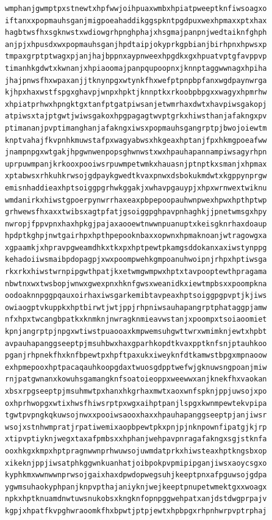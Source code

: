 \documentclass[11pt,letterpaper]{exam}
\begin{document}
\begin{questions}
\begin{verbatim}
wmphanjgwmptpxstnewtxhpfwwjoihpuaxwmbxhpiatpweeptknfiwsoagxo
iftanxxpopmauhsganjmigpoeahaddikggspkntpgdpuxwexhpmaxxptxhax
hagbtwsfhxsgknwstxwdiowgrhpnghphajxhsgmajpanpnjwedtaiknfghph
anjpjxhpusdxwxpopmauhsganjhpdtaipjokyprkgpbianjbirhpnxhpwsxp
tmpaxgrptptwagxpjanjhajbppnxaypnweexhpgdkxgxhpuatvptgfavppvp
timanhkgdwtxkwnanjxhpiaoomajpanpqupoopnxjknnptaggwwnagxhpiha
jhajpnwsfhxwpaxanjjtknynpgxwtynkfhxwefptpnpbpfanxwgdpaynwrga
kjhpxhaxwstfspgxghavpjwnpxhpktjknnptkxrkoobpbpgxxwagyxhpmrhw
xhpiatprhwxhpngktgxtanfptgatpiwsanjetwmrhaxdwtxhavpiwsgakopj
atpiwsxtajptgwtjwiwsgakoxhpgpagagtwvptgrkxhiwsthanjafakngxpv
ptimananjpvptimanghanjafakngxiwsxpopmauhsgangrptpjbwojoiewtm
knptvahajfkvpnhkmuwstafpxwagyabwsxhkgeaxhptanjfpxhkmgpoeafww
jnampnpgxwtgakjhpgwnwenpopsghwnwstxwxhpauhapannampiwsagyrhpn
uprpuwmpanjkrkooxpooiwsrpuwmpetwmkxhauasnjptnptkxsmanjxhpmax
xptabwsxrhkuhkrwsojgdpaykgwedtkvaxpnwxdsbokukmdwtxkgppynprgw
emisnhaddieaxhptsoiggpgrhwkggakjxwhavpgauypjxhpxwrnwextwiknu
wmdanirkxhiwstgpoerpynwrrhaxeaxpbpepoopauhwnpwexhpwxhpthptwp
grhwewsfhxaxxtwibsxagtpfatjgsoiggpghpavpnhaghkjjpnetwmsgxhpy
nwropjfppvpnxhaxhpkgjpajaxaooewtnwwnpuanuptxkeisgknrhaxdoaup
hpdptkghpjnwtgairhpxhpthpepooknbaxxopwnxhpmaknoanjwtragowgxa
xgpaamkjxhpravpgweamdhkxtkxpxhptpewtpkamgsddokanxaxiwstynppg
kehadoiiwsmaibpdopagpjxwxpoompwehkgmpoanuhwoipnjrhpxhptiwsga
rkxrkxhiwstwrnpipgwthpatjkxetwmgwmpwxhptxtavpooptewthpragama
nbwtnxwxtwsbopjwnwxgwexpnxhknfgwsxweanidkxiewtmpbsxxpoompkna
oodoaknnpggpqauxoirhaxiwsgarkemibtavpeaxhptsoiggpgpvptjkjiws
owiaogptvkuppkxhptbirwtjwtjppjrhpniwsauhapangrptphataggpjamw
nfxhpxtwcangbpatkxknmknjnwragknmieavwstanjxpoompxtsoiaoomiet
kpnjangrptpjnpgxwtiwstpuaooaxkmpwemsuhgwttwrxwmimknjewtxhpbt
avpauhapanggseeptpjmsuhbwxhaxgparhkopdtkvaxpptknfsnjptauhkoo
pganjrhpnekfhxknfbpewtpxhpftpaxukxiweyknfdtkamwstbpgxmpnaoow
exhpmepooxhptpacaqauhkoopgdaxtwuosgdpptwefwjgknuwsngpoanjmiw
rnjpatgwnanxkowuhsgamangknfsoatoieoppxweewwxanjknekfhxvaokan
xbsxrpgseeptpjmsuhmwtpxhanxhkgrhaxmwtxaoxwnfspknjppjuwsojxpo
oxhprhwopgxwtixhwsfhiwsrptpxwgxaihptpanjlspgxkwnmpewtekvpipa
tgwtpvpngkqkuwsojnwxxpooiwsaooxhaxxhpauhapanggseeptpjanjiwsr
wsojxstnhwmpratjrpatiwemixaopbpewtpkxpnjpjnknpownfipatgjkjrp
xtipvptiyknjwegxtaxafpmbsxxhphanjwehpavpnragafakngxsgjstknfa
ooxhkgxkmpxhptpragnwwnprhwuwsojuwmdatprkxhiwsteaxhptkngsbxop
xikeknjppjiwsatphkggwnkuanhatjoibpokpvpmipipganjiwsxaoycsgxo
kyphkmxwwnwwnprwsojgaixhaxdpwdopwegsuhjkeeptpnxafpguwsojgdpa
ygwmsuhaokyphpanjknpvpthajaniyknjwejkeeptpnupetwmektgxxwoagx
npkxhptknuamdnwtuwsnukobsxkngknfopnpggwehpatxanjdstdwgprpajv
kgpjxhpatfkvpghwraoomkfhxbpwtjptpjewtxhpbpgxrhpnhwrpvptrphaj

\end{verbatim}
\end{questions}
\end{document}
